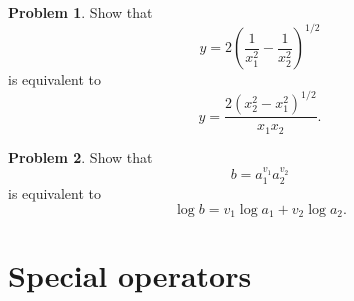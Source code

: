 \documentclass[final,a4paper,12pt]{article}
\theoremstyle{definition}
\newtheorem{problem}{Problem}[section]
\begin{document}
\begin{problem}
    Show that
    \begin{equation*}
        y = 2 \left( \frac{1}{x_1^2} - \frac{1}{x_2^2} \right)^{1/2}
    \end{equation*}
    is equivalent to
    \begin{equation*}
        y = \frac{2 (x_2^2 - x_1^2)^{1/2}}{x_1 x_2} .
    \end{equation*}
\end{problem}

\begin{problem}
    Show that
    \begin{equation*}
        b = a_1^{v_1} a_2^{v_2}
    \end{equation*}
    is equivalent to
    \begin{equation*}
        \log b = v_1 \log a_1 + v_2 \log a_2 .
    \end{equation*}
\end{problem}


\section{Special operators}
\end{document}

